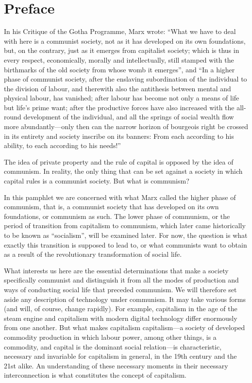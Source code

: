 \documentclass[../main]{subfiles}
\begin{document}
\ifSubfilesClassLoaded{\setcounter{page}{7}}{}
\section{Preface}
\label{sec:02_preface}

In his Critique of the Gotha Programme, Marx wrote: “What we have to deal with here is a communist society, not as it has developed on its own foundations, but, on the contrary, just as it emerges from capitalist society; which is thus in every respect, economically, morally and intellectually, still stamped with the birthmarks of the old society from whose womb it emerges”, and “In a higher phase of communist society, after the enslaving subordination of the individual to the division of labour, and therewith also the antithesis between mental and physical labour, has vanished; after labour has become not only a means of life but life’s prime want; after the productive forces have also increased with the all-round development of the individual, and all the springs of social wealth flow more abundantly—only then can the narrow horizon of bourgeois right be crossed in its entirety and society inscribe on its banners: From each according to his ability, to each according to his needs!”

The idea of private property and the rule of capital is opposed by the idea of communism. In reality, the only thing that can be set against a society in which capital rules is a communist society. But what is communism?

In this pamphlet we are concerned with what Marx called the higher phase of communism, that is, a communist society that has developed on its own foundations, or communism as such. The lower phase of communism, or the period of transition from capitalism to communism, which later came historically to be known as “socialism”, will be examined later. For now, the question is what exactly this transition is supposed to lead to, or what communists want to obtain as a result of the revolutionary transformation of social life.

What interests us here are the essential determinations that make a society specifically communist and distinguish it from all the modes of production and ways of conducting social life that preceded communism. We will therefore set aside any description of technology under communism. It may take various forms (and will, of course, change rapidly). For example, capitalism in the age of the steam engine and capitalism with modern digital technology differ enormously from one another. But what makes capitalism capitalism—a society of developed commodity production in which labour power, among other things, is a commodity, and capital is the dominant social relation—is characteristic, necessary and invariable for capitalism in general, in the 19th century and the 21st alike. An understanding of these necessary moments in their necessary interconnection is what constitutes the concept of capitalism.
\end{document}
